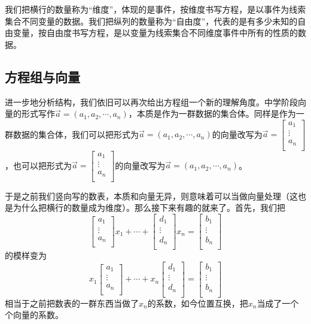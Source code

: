 \documentclass[fontset=none]{ctexart}
\begin{document}
我们把横行的数量称为“维度”，体现的是事件，按维度书写方程，是以事件为线索集合不同变量的数据。我们把纵列的数量称为“自由度”，代表的是有多少未知的自由变量，按自由度书写方程，是以变量为线索集合不同维度事件中所有的性质的数据。

\subsection{方程组与向量}
进一步地分析结构，我们依旧可以再次给出方程组一个新的理解角度。中学阶段向量的形式写作$\vec{a}=\left( a_1,a_2,\cdots ,a_n \right) $，本质是作为一群数据的集合体。同样是作为一群数据的集合体，我们可以把形式为$\vec{a}=\left( a_1,a_2,\cdots ,a_n \right) $的向量改写为$\vec{a}=\left[ \begin{array}{c}
	a_1\\
	\vdots\\
	a_n\\
\end{array} \right] $，也可以把形式为$\vec{a}=\left[ \begin{array}{c}
	a_1\\
	\vdots\\
	a_n\\
\end{array} \right] $的向量改写为$\vec{a}=\left( a_1,a_2,\cdots ,a_n \right) $。

于是之前我们竖向写的数表，本质和向量无异，则意味着可以当做向量处理（这也是为什么把横行的数量成为维度）。那么接下来有趣的就来了。首先，我们把$$\left[ \begin{array}{l}
	a_1\\
	\vdots\\
	a_n\\
\end{array} \right] x_1+\cdots +\left[ \begin{array}{l}
	d_1\\
	\vdots\\
	d_n\\
\end{array} \right] x_n=\left[ \begin{array}{c}
	b_1\\
	\vdots\\
	b_n\\
\end{array} \right] $$的模样变为$$x_1\left[ \begin{array}{l}
	a_1\\
	\vdots\\
	a_n\\
\end{array} \right] +\cdots +x_n\left[ \begin{array}{l}
	d_1\\
	\vdots\\
	d_n\\
\end{array} \right] =\left[ \begin{array}{c}
	b_1\\
	\vdots\\
	b_n\\
\end{array} \right] $$相当于之前把数表的一群东西当做了$x_n$的系数，如今位置互换，把$x_n$当成了一个个向量的系数。
\end{document}
